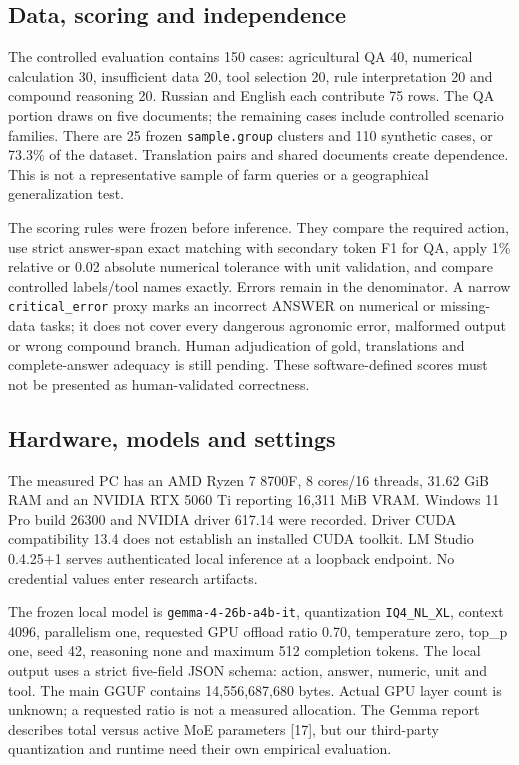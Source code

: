 \documentclass[10pt,a4paper,twocolumn]{article}
\begin{document}
\subsection{Data, scoring and independence}

The controlled evaluation contains 150 cases: agricultural QA 40, numerical calculation 30, insufficient data 20, tool selection 20, rule interpretation 20 and compound reasoning 20. Russian and English each contribute 75 rows. The QA portion draws on five documents; the remaining cases include controlled scenario families. There are 25 frozen \texttt{sample.group} clusters and 110 synthetic cases, or 73.3\% of the dataset. Translation pairs and shared documents create dependence. This is not a representative sample of farm queries or a geographical generalization test.

The scoring rules were frozen before inference. They compare the required action, use strict answer-span exact matching with secondary token F1 for QA, apply 1\% relative or 0.02 absolute numerical tolerance with unit validation, and compare controlled labels/tool names exactly. Errors remain in the denominator. A narrow \texttt{critical\_error} proxy marks an incorrect ANSWER on numerical or missing-data tasks; it does not cover every dangerous agronomic error, malformed output or wrong compound branch. Human adjudication of gold, translations and complete-answer adequacy is still pending. These software-defined scores must not be presented as human-validated correctness.

\subsection{Hardware, models and settings}

The measured PC has an AMD Ryzen 7 8700F, 8 cores/16 threads, 31.62 GiB RAM and an NVIDIA RTX 5060 Ti reporting 16,311 MiB VRAM. Windows 11 Pro build 26300 and NVIDIA driver 617.14 were recorded. Driver CUDA compatibility 13.4 does not establish an installed CUDA toolkit. LM Studio 0.4.25+1 serves authenticated local inference at a loopback endpoint. No credential values enter research artifacts.

The frozen local model is \texttt{gemma-4-26b-a4b-it}, quantization \texttt{IQ4\_NL\_XL}, context 4096, parallelism one, requested GPU offload ratio 0.70, temperature zero, top\_p one, seed 42, reasoning none and maximum 512 completion tokens. The local output uses a strict five-field JSON schema: action, answer, numeric, unit and tool. The main GGUF contains 14,556,687,680 bytes. Actual GPU layer count is unknown; a requested ratio is not a measured allocation. The Gemma report describes total versus active MoE parameters [17], but our third-party quantization and runtime need their own empirical evaluation.
\end{document}

